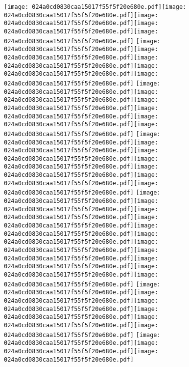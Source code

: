 \documentclass{article}
\newcommand{\origpg}[2]{\texttt{[image: 024a0cd0830caa15017f55f5f20e680e.pdf]}}
\begin{document}
{\vspace{27.944pt}\hspace{18.094pt}\origpg5{103.4pt 559.54pt 114.4pt 575.68pt}\origpg5{114.47pt 559.54pt 121.63pt 575.68pt}\hspace{0.291pt}\origpg5{121.93pt 559.54pt 129.98pt 575.68pt}\origpg5{129.88pt 559.54pt 137.05pt 575.68pt}\hspace{-0.178pt}\origpg5{136.87pt 559.54pt 144.04pt 575.68pt} \origpg5{163.12pt 559.54pt 171.33pt 575.68pt}\hspace{-0.742pt}\origpg5{170.59pt 559.54pt 178.66pt 575.68pt}\hspace{-1.324pt}\origpg5{177.34pt 559.54pt 185.55pt 575.68pt}\origpg5{185.55pt 559.54pt 192.72pt 575.68pt}\hspace{-0.21pt}\origpg5{192.51pt 559.54pt 199.56pt 575.68pt} \origpg5{218.75pt 559.54pt 226.82pt 575.68pt}\hspace{-0.113pt}\origpg5{226.71pt 559.54pt 235.34pt 575.68pt}\origpg5{235.34pt 559.54pt 243.98pt 575.68pt}\origpg5{244.04pt 559.54pt 251.21pt 575.68pt}\hspace{0.291pt}\origpg5{251.5pt 559.54pt 258.67pt 575.68pt}\origpg5{258.71pt 559.54pt 267.35pt 575.68pt} \origpg5{286.4pt 559.54pt 295.03pt 575.68pt}\hspace{-0.21pt}\origpg5{294.82pt 559.54pt 302.89pt 575.68pt}\origpg5{302.99pt 559.54pt 311.06pt 575.68pt}\hspace{-0.113pt}\origpg5{310.94pt 559.54pt 319.58pt 575.68pt}\origpg5{319.58pt 559.54pt 326.75pt 575.68pt}\hspace{0.323pt}\origpg5{327.07pt 559.54pt 334.23pt 575.68pt}\origpg5{334.28pt 559.54pt 341.45pt 575.68pt} \origpg5{360.53pt 559.54pt 368.6pt 575.68pt}\hspace{-0.113pt}\origpg5{368.48pt 559.54pt 375.65pt 575.68pt}\origpg5{375.7pt 559.54pt 382.87pt 575.68pt}\hspace{-0.178pt}\origpg5{134.5mm 559.54pt 389.85pt 575.68pt}\hspace{0.291pt}\origpg5{390.14pt 559.54pt 397.31pt 575.68pt}\hspace{-0.178pt}\origpg5{397.13pt 559.54pt 405.77pt 575.68pt}\origpg5{405.77pt 559.54pt 413.39pt 575.68pt}\hspace{-0.113pt}\origpg5{413.27pt 559.54pt 420.44pt 575.68pt}\hspace{-0.178pt}\origpg5{420.26pt 559.54pt 428.9pt 575.68pt}\origpg5{428.9pt 559.54pt 437.53pt 575.68pt}\origpg5{437.6pt 559.54pt 445.02pt 575.68pt} \origpg5{463.84pt 559.54pt 471.96pt 575.68pt}\origpg5{472.01pt 559.54pt 479.17pt 575.68pt}\origpg5{479.22pt 559.54pt 486.39pt 575.68pt}\origpg5{486.44pt 559.54pt 493.49pt 575.68pt}\hspace{-0.307pt}\origpg5{493.18pt 559.54pt 501.82pt 575.68pt}\origpg5{501.82pt 559.54pt 510.45pt 575.68pt} \origpg5{529.55pt 559.54pt 538.18pt 575.68pt}\hspace{-0.21pt}\origpg5{537.97pt 559.54pt 546.04pt 575.68pt}\origpg5{546.14pt 559.54pt 554.78pt 575.68pt} 

}
\end{document}

